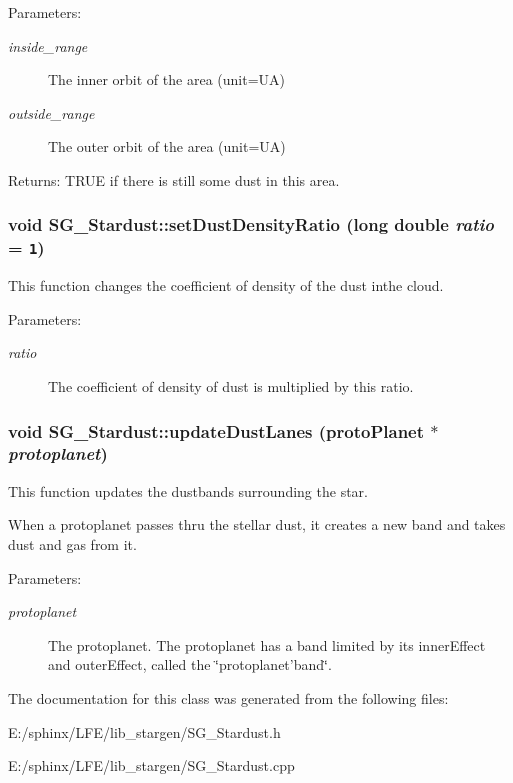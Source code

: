 \begin{Desc}
\item[Parameters:]
\begin{description}
\item[{\em inside\_\-range}]The inner orbit of the area (unit=UA) \item[{\em outside\_\-range}]The outer orbit of the area (unit=UA) \end{description}
\end{Desc}
\begin{Desc}
\item[Returns:]TRUE if there is still some dust in this area. \end{Desc}
\subsubsection{\setlength{\rightskip}{0pt plus 5cm}void SG\_\-Stardust::set\-Dust\-Density\-Ratio (long double {\em ratio} = {\tt 1})}\label{class_s_g___stardust_a3}


This function changes the coefficient of density of the dust inthe cloud. 

\begin{Desc}
\item[Parameters:]
\begin{description}
\item[{\em ratio}]The coefficient of density of dust is multiplied by this ratio. \end{description}
\end{Desc}
\subsubsection{\setlength{\rightskip}{0pt plus 5cm}void SG\_\-Stardust::update\-Dust\-Lanes (proto\-Planet $\ast$ {\em protoplanet})\hspace{0.3cm}{\tt  [protected]}}\label{class_s_g___stardust_b5}


This function updates the dustbands surrounding the star. 

When a protoplanet passes thru the stellar dust, it creates a new band and takes dust and gas from it. \begin{Desc}
\item[Parameters:]
\begin{description}
\item[{\em protoplanet}]The protoplanet. The protoplanet has a band limited by its inner\-Effect and outer\-Effect, called the \char`\"{}protoplanet'band\char`\"{}. \end{description}
\end{Desc}


The documentation for this class was generated from the following files:\begin{CompactItemize}
\item 
E:/sphinx/LFE/lib\_\-stargen/SG\_\-Stardust.h\item 
E:/sphinx/LFE/lib\_\-stargen/SG\_\-Stardust.cpp\end{CompactItemize}
